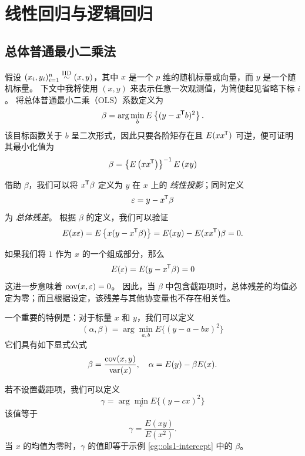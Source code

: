 
\chapter{线性回归与逻辑回归}
\label{appendix::basic-linear-regression}
 
 \section{总体普通最小二乘法}\label{sec::populationOLS}
 
 
假设 $(x_{i},y_{i})_{i=1}^{n} \stackrel{\textup{IID}}{\sim} (x,y)$，其中 $x $ 是一个 $p$ 维的随机标量或向量，而 $y $ 是一个随机标量。  
下文中我将使用 $(x,y)$ 来表示任意一次观测值，为简便起见省略下标 $i$。  
将总体普通最小二乘（OLS）系数定义为  
\[
\beta=\arg\min_{b } E\left\{ (y-x ^{\mkern-1.5mu\mathsf{T}} b)^{2}\right\} .
\]  
该目标函数关于 $b$ 呈二次形式，因此只要各阶矩存在且 $E(xx ^{\mkern-1.5mu\mathsf{T}} )$ 可逆，便可证明其最小化值为  
$$
\beta=\left\{ E\left(xx ^{\mkern-1.5mu\mathsf{T}} \right)\right\} ^{-1}E\left(xy\right)
$$ 

借助 $\beta$，我们可以将 $x ^{\mkern-1.5mu\mathsf{T}} \beta$ 定义为 $y$ 在 $x$ 上的 {\it 线性投影}；同时定义 \begin{equation}
\varepsilon=y-x ^{\mkern-1.5mu\mathsf{T}} \beta\label{eq:populationresidualols}
\end{equation} 为 {\it 总体残差}。  
根据 $\beta$ 的定义，我们可以验证 $$
E(x\varepsilon)=E\left\{ x(y-x ^{\mkern-1.5mu\mathsf{T}} \beta)\right\} =E(xy)-E(xx ^{\mkern-1.5mu\mathsf{T}} )\beta=0. 
$$


\begin{example}
[带截距项的总体普通最小二乘法]
如果我们将 $1$ 作为 $x$ 的一个组成部分，那么
$$
E(\varepsilon)
=E(y-x ^{\mkern-1.5mu\mathsf{T}} \beta)
=0
$$
这进一步意味着 $\textup{cov}(x,\varepsilon)=0$。
因此，当 $\beta$ 中包含截距项时，总体残差的均值必定为零；而且根据设定，该残差与其他协变量也不存在相关性。 
\end{example}


 
\begin{example}
[仅含一个变量的总体情形下带截距项的普通最小二乘法]\label{eg::ols1-intercept}
一个重要的特例是：对于标量 $x$ 和 $y$，我们可以定义
$$
(\alpha, \beta)  = \arg\min_{a,b} E \{  (y - a - bx)^2 \}
$$
它们具有如下显式公式
$$
\beta = \frac{  \textup{cov}(x,y) }{\textup{var}(x)},\quad 
\alpha = E(y)  - \beta E(x).
$$
\end{example}

 
 \begin{example}
[不含截距项的单变量总体普通最小二乘法]
若不设置截距项，我们可以定义
$$
\gamma = \arg\min_{c} E \{  (y  - c x)^2 \}
$$
该值等于
$$
\gamma = \frac{  E(xy) }{E(x^2)}.
$$
当 $x$ 的均值为零时，$ \gamma$ 的值即等于示例 \ref{eg::ols1-intercept} 中的 $\beta $。 
\end{example}







